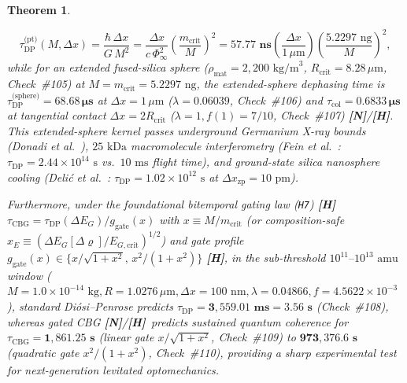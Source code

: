 \documentclass[11pt,a4paper]{article}
\newcommand{\catH}{\textbf{\textcolor{orange!85!black}{[H]}}}
\newcommand{\catN}{\textbf{\textcolor{teal!75!black}{[N]}}}
\newtheorem{theorem}{Theorem}[section]
\theoremstyle{definition}
\theoremstyle{remark}
\begin{document}
\begin{theorem}
\begin{enumerate}
  \begin{equation}
    \tau_{\text{DP}}^{\text{(pt)}}(M, \Delta x) = \frac{\hbar\,\Delta x}{G\,M^2} = \frac{\Delta x}{c\,\Phi_{\infty}^2}\left(\frac{m_{\text{crit}}}{M}\right)^2 = \mathbf{57.77\text{ ns}}\left(\frac{\Delta x}{1\,\mu\text{m}}\right)\left(\frac{5.2297\text{ ng}}{M}\right)^2,
    \label{eq:bitemporal_collapse_time}
  \end{equation}
  while for an extended fused-silica sphere ($\rho_{\text{mat}} = 2{,}200\text{ kg/m}^3$, $R_{\text{crit}} = 8.28\,\mu\text{m}$, Check~\#105) at $M = m_{\text{crit}} = 5.2297\text{ ng}$, the extended-sphere dephasing time is $\tau_{\text{DP}}^{\text{(sphere)}} = \mathbf{68.68\,\mu\text{s}}$ at $\Delta x = 1\,\mu\text{m}$ ($\lambda = 0.06039$, Check~\#106) and $\tau_{\text{col}} = \mathbf{0.6833\,\mu\text{s}}$ at tangential contact $\Delta x = 2R_{\text{crit}}$ ($\lambda = 1, f(1) = 7/10$, Check~\#107) \catN/\catH. This extended-sphere kernel passes underground Germanium X-ray bounds (Donadi \textit{et al.}\ \cite{Donadi2021}), $25\text{ kDa}$ macromolecule interferometry (Fein \textit{et al.}\ \cite{Fein2019}: $\tau_{\text{DP}} = 2.44 \times 10^{14}\text{ s}$ vs.\ $10\text{ ms}$ flight time), and ground-state silica nanosphere cooling (Deli\'c \textit{et al.}\ \cite{Delic2020}: $\tau_{\text{DP}} = 1.02 \times 10^{12}\text{ s}$ at $\Delta x_{\text{zp}} = 10\text{ pm}$).

  Furthermore, under the foundational bitemporal gating law (\texttt{H7}) \catH\ $\tau_{\text{CBG}} = \tau_{\text{DP}}(\Delta E_G)/g_{\text{gate}}(x)$ with $x \equiv M/m_{\text{crit}}$ (or composition-safe $x_E \equiv (\Delta E_G[\Delta\varrho]/E_{G,\text{crit}})^{1/2}$) and gate profile $g_{\text{gate}}(x) \in \{x/\sqrt{1+x^2}, \, x^2/(1+x^2)\}$ \catH, in the sub-threshold $10^{11}\text{--}10^{13}\text{ amu}$ window ($M = 1.0 \times 10^{-14}\text{ kg}, R = 1.0276\,\mu\text{m}, \Delta x = 100\text{ nm}, \lambda = 0.04866, f = 4.5622 \times 10^{-3}$), standard Di\'osi--Penrose predicts $\tau_{\text{DP}} = \mathbf{3{,}559.01\text{ ms}} = \mathbf{3.56\text{ s}}$ (Check~\#108), whereas gated CBG \catN/\catH\ predicts sustained quantum coherence for $\tau_{\text{CBG}} = \mathbf{1{,}861.25\text{ s}}$ (linear gate $x/\sqrt{1+x^2}$, Check~\#109) to $\mathbf{973{,}376.6\text{ s}}$ (quadratic gate $x^2/(1+x^2)$, Check~\#110), providing a sharp experimental test for next-generation levitated optomechanics.
\end{enumerate}
\end{theorem}
\end{document}
